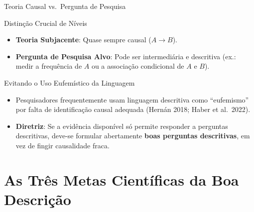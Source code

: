 \documentclass[
  ignorenonframetext,
  aspectratio=169,
  brazilian,
  t,
  10pt]{beamer}
\providecommand{\tightlist}{%
  \setlength{\itemsep}{0pt}\setlength{\parskip}{0pt}}
\begin{document}
\begin{frame}{Teoria Causal vs.~Pergunta de Pesquisa}
\protect{}\label{teoria-causal-vs.-pergunta-de-pesquisa}
\begin{block}{Distinção Crucial de Níveis}
\protect{}\label{distinuxe7uxe3o-crucial-de-nuxedveis}
\begin{itemize}
\tightlist
\item
  \textbf{Teoria Subjacente}: Quase sempre causal (\(A \to B\)).
\item
  \textbf{Pergunta de Pesquisa Alvo}: Pode ser intermediária e
  descritiva (ex.: medir a frequência de \(A\) ou a associação
  condicional de \(A\) e \(B\)).
\end{itemize}
\end{block}

\begin{block}{Evitando o Uso Eufemístico da Linguagem}
\protect{}\label{evitando-o-uso-eufemuxedstico-da-linguagem}
\begin{itemize}
\tightlist
\item
  Pesquisadores frequentemente usam linguagem descritiva como
  ``eufemismo'' por falta de identificação causal adequada (Hernán 2018;
  Haber et al.~2022).
\item
  \textbf{Diretriz}: Se a evidência disponível só permite responder a
  perguntas descritivas, deve-se formular abertamente \textbf{boas
  perguntas descritivas}, em vez de fingir causalidade fraca.
\end{itemize}
\end{block}
\end{frame}

\section{As Três Metas Científicas da Boa
Descrição}\label{as-truxeas-metas-cientuxedficas-da-boa-descriuxe7uxe3o}
\end{document}
